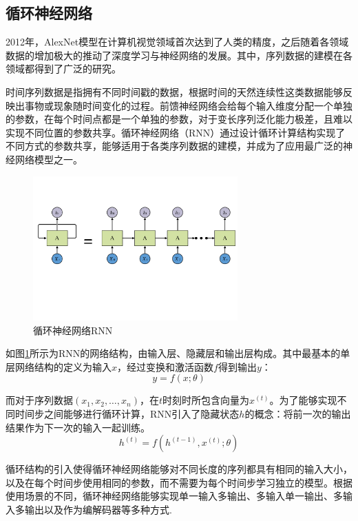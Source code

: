 \documentclass[master]{thesis-uestc}
\begin{document}
\subsection{循环神经网络}
2012年，AlexNet模型在计算机视觉领域首次达到了人类的精度，之后随着各领域数据的增加极大的推动了深度学习与神经网络的发展。其中，序列数据的建模在各领域都得到了广泛的研究。

时间序列数据是指拥有不同时间戳的数据，根据时间的天然连续性这类数据能够反映出事物或现象随时间变化的过程。前馈神经网络会给每个输入维度分配一个单独的参数，在每个时间点都是一个单独的参数，对于变长序列泛化能力极差，且难以实现不同位置的参数共享。循环神经网络（RNN）通过设计循环计算结构实现了不同方式的参数共享，能够适用于各类序列数据的建模，并成为了应用最广泛的神经网络模型之一。

\begin{figure}[!ht]
\centering 
\includegraphics[width=0.7\textwidth]{./pic/RNN-2.pdf}
\caption{循环神经网络RNN}
\label{Figure.2.1}
\end{figure}
如图\ref{Figure.2.1}所示为RNN的网络结构，由输入层、隐藏层和输出层构成。其中最基本的单层网络结构的定义为输入$x$，经过变换和激活函数$f$得到输出$y$：
\begin{equation}
   y = f(x;\theta)
\end{equation}

而对于序列数据$(x_1,x_2,\dots,x_n)$，在$t$时刻时所包含向量为$x^{(t)}$。为了能够实现不同时间步之间能够进行循环计算，RNN引入了隐藏状态$h$的概念：将前一次的输出结果作为下一次的输入一起训练。
\begin{equation}
   h^{(t)} = f(h^{(t-1)},x^{(t)};\theta)
\end{equation}

循环结构的引入使得循环神经网络能够对不同长度的序列都具有相同的输入大小，以及在每个时间步使用相同的参数，而不需要为每个时间步学习独立的模型。根据使用场景的不同，循环神经网络能够实现单一输入多输出、多输入单一输出、多输入多输出以及作为编解码器等多种方式.
\end{document}
